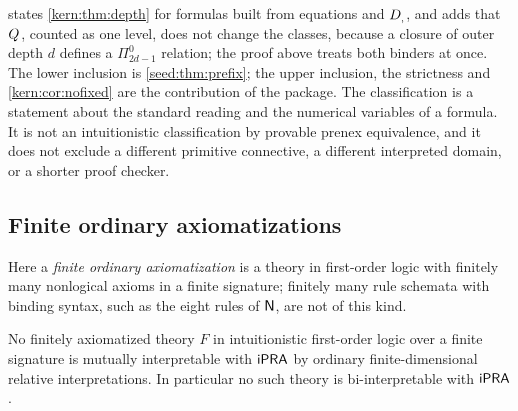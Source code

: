\begin{remark}
\label{kern:rem:depth-sources}
 states \cref{kern:thm:depth} for formulas built from
equations and $D_{,}$, and adds that $Q_{}$, counted as one level, does not
change the classes, because a closure of outer depth $d$ defines a
$\Pi^0_{2d-1}$ relation; the proof above treats both binders at once.  The
lower inclusion is \cref{seed:thm:prefix}; the upper inclusion, the
strictness and \cref{kern:cor:nofixed} are the contribution of the
package.  The classification is a statement about the standard reading and
the numerical variables of a formula.  It is not an intuitionistic
classification by provable prenex equivalence, and it does not exclude a
different primitive connective, a different interpreted domain, or a
shorter proof checker.
\end{remark}

\subsection{Finite ordinary axiomatizations}
\label{kern:sec:finax}

Here a \emph{finite ordinary axiomatization} is a theory in first-order
logic with finitely many nonlogical axioms in a finite signature; finitely
many rule schemata with binding syntax, such as the eight rules of $\mathsf{N}$,
are not of this kind.

\begin{proposition}
\label{kern:prop:finax}
No finitely axiomatized theory $F$ in intuitionistic first-order logic over
a finite signature is mutually interpretable with $\mathsf{iPRA}$ by ordinary
finite-dimensional relative interpretations.  In particular no such theory
is bi-interpretable with $\mathsf{iPRA}$.
\end{proposition}

